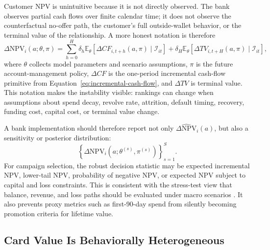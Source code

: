 \documentclass[11pt]{article}
\newcommand{\E}{\mathbb{E}}
\newcommand{\NPV}{\mathrm{NPV}}
\newcommand{\1}{\mathbf{1}}
\begin{document}
Customer NPV is unintuitive because it is not directly observed. The bank
observes partial cash flows over finite calendar time; it does not observe the
counterfactual no-offer path, the customer's full outside-wallet behavior, or
the terminal value of the relationship. A more honest notation is therefore
\begin{equation}
  \Delta \NPV_i(a;\theta,\pi)
  =
  \sum_{h=0}^{H}
  \delta_h
  \E_\theta[
    \Delta CF_{i,t+h}(a,\pi)
    \mid \mathcal{I}_{it}
  ]
  +
  \delta_H
  \E_\theta[
    \Delta TV_{i,t+H}(a,\pi)
    \mid \mathcal{I}_{it}
  ],
  \label{eq:npv-theta-policy}
\end{equation}
where $\theta$ collects model parameters and scenario assumptions, $\pi$ is the
future account-management policy, $\Delta CF$ is the one-period incremental
cash-flow primitive from Equation~\eqref{eq:incremental-cash-flow}, and
$\Delta TV$ is terminal value. This notation makes the instability visible:
rankings can change when assumptions about spend decay, revolve rate,
attrition, default timing, recovery, funding cost, capital cost, or terminal
value change.

A bank implementation should therefore report not only
$\widehat{\Delta \NPV}_i(a)$, but also a sensitivity or posterior distribution:
\begin{equation}
  \left\{
    \Delta \NPV_i(a;\theta^{(s)},\pi^{(s)})
  \right\}_{s=1}^{S}.
  \label{eq:npv-sensitivity-draws}
\end{equation}
For campaign selection, the robust decision statistic may be expected
incremental NPV, lower-tail NPV, probability of negative NPV, or expected NPV
subject to capital and loss constraints. This is consistent with the stress-test
view that balance, revenue, and loss paths should be evaluated under macro
scenarios \citep{federalreserve2025stressmethodology,federalreserve2026stressmethodology}.
It also prevents proxy metrics such as first-90-day spend from silently becoming
promotion criteria for lifetime value.

\subsection{Card Value Is Behaviorally Heterogeneous}
\label{subsec:behavioral-heterogeneity}
\end{document}
